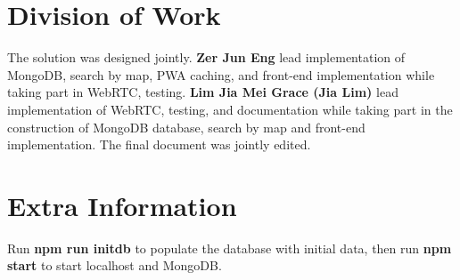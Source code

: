 \documentclass[11pt, a4paper]{article}
\begin{document}
\section{Division of Work}
The solution was designed jointly. \textbf{Zer Jun Eng} lead implementation of MongoDB, search
by map, PWA caching, and front-end implementation while taking part in WebRTC, testing.
\textbf{Lim Jia Mei Grace (Jia Lim)} lead implementation of WebRTC, testing, and documentation
while taking part in the construction of MongoDB database, search by map and front-end
implementation. The final document was jointly edited. 

\section{Extra Information}
Run \textbf{npm run initdb} to populate the database with initial data, then run \textbf{npm start}
to start localhost and MongoDB.

\printbibliography

\appendix
\end{document}
